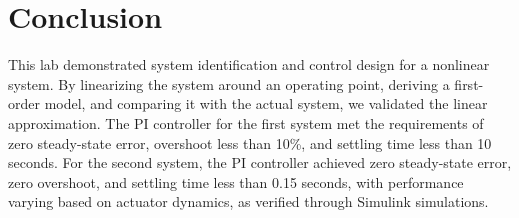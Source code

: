 \documentclass{article}
\begin{document}
\section*{Conclusion}
This lab demonstrated system identification and control design for a nonlinear system. By linearizing the system around an operating point, deriving a first-order model, and comparing it with the actual system, we validated the linear approximation. The PI controller for the first system met the requirements of zero steady-state error, overshoot less than 10\%, and settling time less than 10 seconds. For the second system, the PI controller achieved zero steady-state error, zero overshoot, and settling time less than 0.15 seconds, with performance varying based on actuator dynamics, as verified through Simulink simulations.
\end{document}
